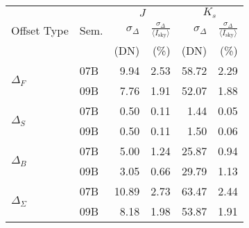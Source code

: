 \begin{tabular}{ll|rr|rr}
&  & \multicolumn{2}{c|}{$J$} & \multicolumn{2}{c}{$K_s$} \\ %
Offset Type & Sem. & $\sigma_\Delta$ & $\frac{\sigma_\Delta}{\langle I_\mathrm{sky}\rangle }$ & $\sigma_\Delta$ & $\frac{\sigma_\Delta}{\langle I_\mathrm{sky}\rangle }$ \\
& & \tiny{(DN)} &  \tiny{(\%)} & \tiny{(DN)} &  \tiny{(\%)} \\
\hline
\multirow{2}{*}{$\Delta_F$} & 07B & 9.94 & 2.53 & 58.72 & 2.29 \\
& 09B  & 7.76 & 1.91 & 52.07 & 1.88 \\
\hline
\multirow{2}{*}{$\Delta_S$} & 07B & 0.50 & 0.11 & 1.44 & 0.05 \\
& 09B & 0.50 & 0.11 & 1.50 & 0.06 \\
\hline
\multirow{2}{*}{$\Delta_B$} & 07B & 5.00 & 1.24 & 25.87 & 0.94 \\
& 09B &  3.05 & 0.66 & 29.79 & 1.13 \\
\hline
\multirow{2}{*}{$\Delta_\Sigma$} & 07B &  10.89 & 2.73 & 63.47 & 2.44 \\
& 09B &  8.18 & 1.98 & 53.87 & 1.91 \\
\end{tabular}